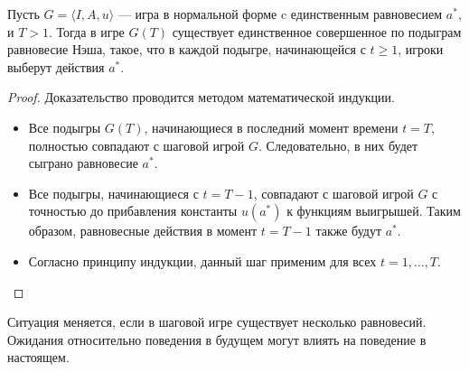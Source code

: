 \begin{theorem}
Пусть $G = \langle I, A, u \rangle$ — игра в нормальной форме c единственным равновесием $a^*$, и $T > 1$. Тогда в игре $G(T)$ существует единственное совершенное по подыграм равновесие Нэша, такое, что в каждой подыгре, начинающейся с $t \ge 1$, игроки выберут действия $a^*$.
\end{theorem}

\begin{proof}
Доказательство проводится методом математической индукции.
\begin{itemize}
    \item Все подыгры $G(T)$, начинающиеся в последний момент времени $t = T$, полностью совпадают с шаговой игрой $G$. Следовательно, в них будет сыграно равновесие $a^*$.
    \item Все подыгры, начинающиеся с $t = T - 1$, совпадают с шаговой игрой $G$ с точностью до прибавления константы $u(a^*)$ к функциям выигрышей. Таким образом, равновесные действия в момент $t = T - 1$ также будут $a^*$.
    \item Согласно принципу индукции, данный шаг применим для всех $t = 1, \dots, T$.
\end{itemize}
\end{proof}

Ситуация меняется, если в шаговой игре существует несколько равновесий. Ожидания относительно поведения в будущем могут влиять на поведение в настоящем.


